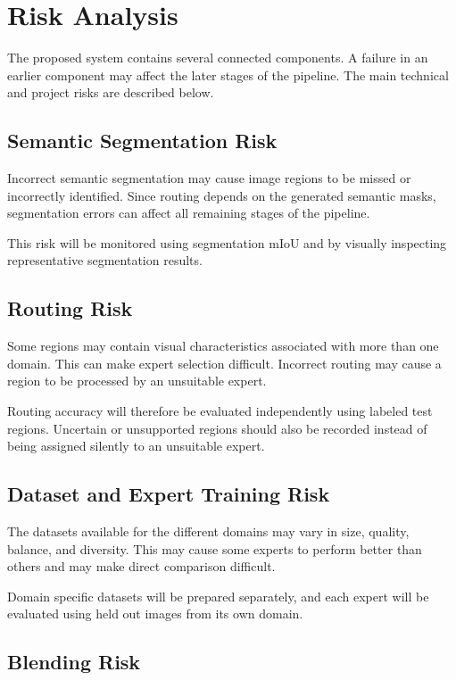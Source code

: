 \documentclass{FastFyp}
\begin{document}
\section{Risk Analysis}

The proposed system contains several connected components. A failure in an earlier component may affect the later stages of the pipeline. The main technical and project risks are described below.

\subsection{Semantic Segmentation Risk}

Incorrect semantic segmentation may cause image regions to be missed or incorrectly identified. Since routing depends on the generated semantic masks, segmentation errors can affect all remaining stages of the pipeline.

This risk will be monitored using segmentation mIoU and by visually inspecting representative segmentation results.

\subsection{Routing Risk}

Some regions may contain visual characteristics associated with more than one domain. This can make expert selection difficult. Incorrect routing may cause a region to be processed by an unsuitable expert.

Routing accuracy will therefore be evaluated independently using labeled test regions. Uncertain or unsupported regions should also be recorded instead of being assigned silently to an unsuitable expert.

\subsection{Dataset and Expert Training Risk}

The datasets available for the different domains may vary in size, quality, balance, and diversity. This may cause some experts to perform better than others and may make direct comparison difficult.

Domain specific datasets will be prepared separately, and each expert will be evaluated using held out images from its own domain.

\subsection{Blending Risk}
\end{document}
